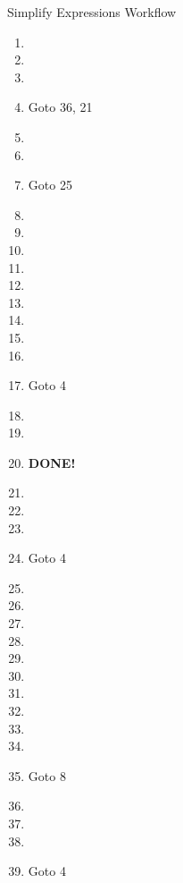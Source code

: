 \documentclass[10pt,landscape]{article}
\begin{document}
\begin{multicols}{3}
\begin{mysection}{Simplify Expressions Workflow}
\begin{multicols}{2}
\begin{enumerate}
	\item {}
	\item {}
	\item {}
	\item {} Goto 36, 21
	\item {}
	\item {}
	\item {} Goto 25
	\item {}
	\item {}
	\item {}
	\item {}
	\item {}
	\item {}
	\item {}
	\item {}
	\item {}
	\item {} Goto 4
	\item {}
	\item {}
	\item {} \textbf{DONE!}
	\item {}
	\item {}
	\item {}
	\item {} Goto 4
	\item {}
	\item {}
	\item {}
	\item {}
	\item {}
	\item {}
	\item {}
	\item {}
	\item {}
	\item {}
	\item {} Goto 8
	\item {}
	\item {}
	\item {}
	\item {} Goto 4
\end{enumerate}


\end{multicols}
\end{mysection}
\end{multicols}
\end{document}
